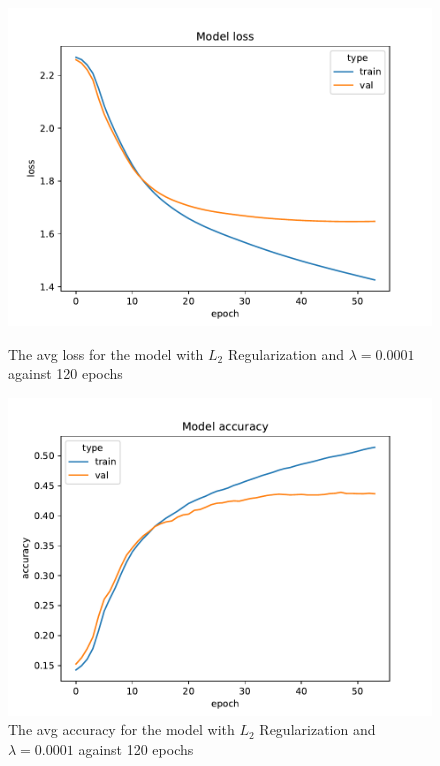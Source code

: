 \documentclass{article}
\begin{document}
    \begin{figure}[H]
        \begin{minipage}[b]{0.5\linewidth}
            \centering
            \includegraphics[width=\textwidth]{../plots/config_2d_L2_-4_0.001_loss}
            \caption{The avg loss for the model with $L_2$ Regularization and $\lambda = 0.0001$ against 120 epochs}
            \label{fig:figure5}
        \end{minipage}
        \hspace{0.2cm}
        \begin{minipage}[b]{0.5\linewidth}
            \centering
            \includegraphics[width=\textwidth]{../plots/config_2d_L2_-4_0.001_accuracy}
            \caption{The avg accuracy for the model with $L_2$ Regularization and $\lambda = 0.0001$ against 120 epochs}
            \label{fig:figure6}
        \end{minipage}
    \end{figure}
\end{document}
